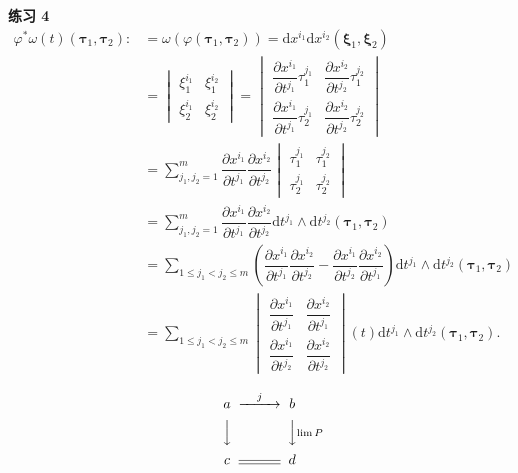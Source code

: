 \documentclass[UTF8, a4paper, 12pt, oneside, onecolumn]{article}
\begin{document}
{\bf 练习 4} \begin{equation*}\begin{split}
\varphi^*\omega(t)(\bm{\tau}_1, \bm{\tau}_2) :&= \omega(\varphi(\bm{\tau}_1, \bm{\tau}_2)) = \mathrm{d} x^{i_1} \mathrm{d} x^{i_2}(\bm{\xi}_1, \bm{\xi}_2) \\
&= \begin{vmatrix}
	\xi_1^{i_1}	& \xi_1^{i_2} \\
	\xi_2^{i_1}	& \xi_2^{i_2}
\end{vmatrix} = \begin{vmatrix}
	\dfrac{\partial x^{i_1}}{\partial t^{j_1}} \tau_1^{j_1}	& \dfrac{\partial x^{i_2}}{\partial t^{j_2}} \tau_1^{j_2} \\
	\dfrac{\partial x^{i_1}}{\partial t^{j_1}} \tau_2^{j_1}	& \dfrac{\partial x^{i_2}}{\partial t^{j_2}} \tau_2^{j_2}
\end{vmatrix} \\
&= \sum_{j_1, j_2 = 1}^m \dfrac{\partial x^{i_1}}{\partial t^{j_1}} \dfrac{\partial x^{i_2}}{\partial t^{j_2}} \begin{vmatrix}
	\tau_1^{j_1} & \tau_1^{j_2} \\
	\tau_2^{j_1} & \tau_2^{j_2}
\end{vmatrix} \\
&= \sum_{j_1, j_2 = 1}^m \dfrac{\partial x^{i_1}}{\partial t^{j_1}} \dfrac{\partial x^{i_2}}{\partial t^{j_2}} \mathrm{d} t^{j_1} \wedge \mathrm{d} t^{j_2} (\bm{\tau}_1, \bm{\tau}_2) \\
&= \sum_{1 \leqslant j_1 < j_2 \leqslant m} \left(\dfrac{\partial x^{i_1}}{\partial t^{j_1}} \dfrac{\partial x^{i_2}}{\partial t^{j_2}} - \dfrac{\partial x^{i_1}}{\partial t^{j_2}} \dfrac{\partial x^{i_2}}{\partial t^{j_1}}\right) \mathrm{d} t^{j_1} \wedge \mathrm{d} t^{j_2} (\bm{\tau}_1, \bm{\tau}_2) \\
&= \sum_{1 \leqslant j_1 < j_2 \leqslant m} \begin{vmatrix}
	\dfrac{\partial x^{i_1}}{\partial t^{j_1}} & \dfrac{\partial x^{i_2}}{\partial t^{j_1}} \\
	\dfrac{\partial x^{i_1}}{\partial t^{j_2}} & \dfrac{\partial x^{i_2}}{\partial t^{j_2}}
\end{vmatrix}(t) \mathrm{d} t^{j_1} \wedge \mathrm{d} t^{j_2} (\bm{\tau}_1, \bm{\tau}_2).
\end{split}\end{equation*}

\begin{equation}\begin{CD}
	a		@>j>>	b \\
	@VVV			@VV{\lim P}V \\
	c		@=		d
\end{CD}\end{equation}
\end{document}
